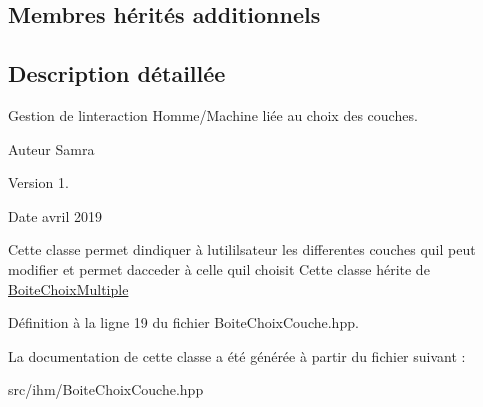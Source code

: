 \subsection*{Membres hérités additionnels}


\subsection{Description détaillée}
Gestion de l\textquotesingle{}interaction Homme/\+Machine liée au choix des couches. 

\begin{DoxyAuthor}{Auteur}
Samra 
\end{DoxyAuthor}
\begin{DoxyVersion}{Version}
1. 
\end{DoxyVersion}
\begin{DoxyDate}{Date}
avril 2019
\end{DoxyDate}
Cette classe permet d\textquotesingle{}indiquer à l\textquotesingle{}utililsateur les differentes couches qu\textquotesingle{}il peut modifier et permet d\textquotesingle{}acceder à celle qu\textquotesingle{}il choisit Cette classe hérite de \hyperlink{class_boite_choix_multiple}{Boite\+Choix\+Multiple} 

Définition à la ligne 19 du fichier Boite\+Choix\+Couche.\+hpp.



La documentation de cette classe a été générée à partir du fichier suivant \+:\begin{DoxyCompactItemize}
\item 
src/ihm/Boite\+Choix\+Couche.\+hpp\end{DoxyCompactItemize}
